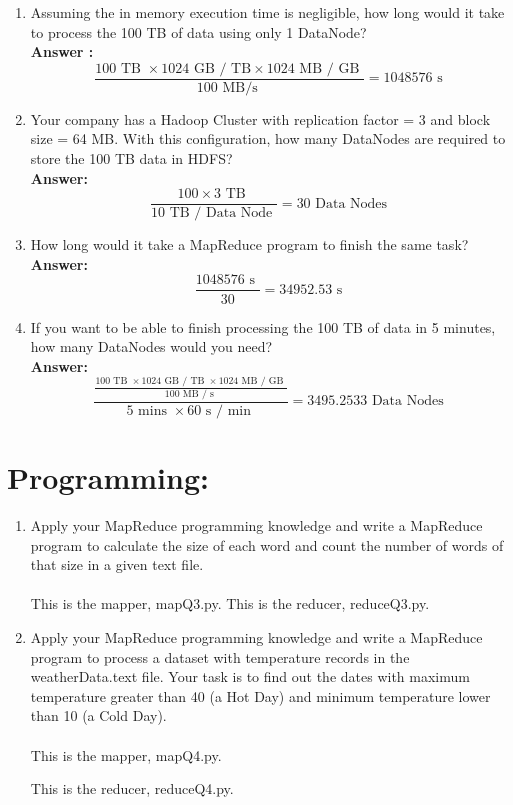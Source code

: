 \documentclass[12pt]{article}
\begin{document}
\begin{enumerate}
\item Assuming the in memory execution time is negligible, how long would it take to process the 100 TB of data using only 1 DataNode? \\
\textbf{Answer :} $$ \frac{100 \text{ TB } \times 1024 \text{ GB / TB} \times 1024 \text{ MB / GB }}{100 \text{ MB/s }} = 1048576 \text{ s } $$ 
\item Your company has a Hadoop Cluster with replication factor = 3 and block size = 64 MB. With this configuration, how many DataNodes are required to store the 100 TB data in HDFS? \\
\textbf{Answer: } $$ \frac{100 \times 3 \text{ TB }}{10 \text{ TB / Data Node }} = 30 \text{ Data Nodes } $$ 
\item How long would it take a MapReduce program to finish the same task? \\
\textbf{Answer: } $$ \frac{1048576 \text{ s }}{30} = 34952.53 \text{ s } $$ 
\item If you want to be able to finish processing the 100 TB of data in 5 minutes, how many DataNodes would you need? \\
\textbf{Answer: } $$ \frac{\frac{100 \text{ TB } \times 1024 \text{ GB / TB } \times 1024 \text{ MB / GB }}{100 \text{ MB / s }}}{5 \text{ mins } \times 60 \text{ s / min }} = 3495.2533 \text{ Data Nodes }$$ 
\end{enumerate} \newpage

\section{Programming: } 
\begin{enumerate}

\item Apply your MapReduce programming knowledge and write a MapReduce program to calculate the size of each word and count the number of words of that size in a given text file. \\~\\
This is the mapper, mapQ3.py.
 \newpage
This is the reducer, reduceQ3.py.
 \newpage

\item Apply your MapReduce programming knowledge and write a MapReduce program to process a dataset with temperature records in the weatherData.text file. Your task is to find out the dates with maximum temperature greater than 40 (a Hot Day) and minimum temperature lower than 10 (a Cold Day). \\~\\
This is the mapper, mapQ4.py.
 
This is the reducer, reduceQ4.py. 


\end{enumerate}
\end{document}

